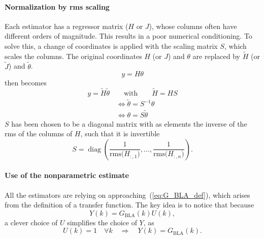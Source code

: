 \paragraph{Normalization by rms scaling} Each estimator has a regressor matrix ($H$ or $J$), whose columns often have different orders of magnitude. This results in a poor numerical conditioning. To solve this, a change of coordinates is applied with the scaling matrix $S$, which scales the columns. The original coordinates $H$ (or $J$) and $\theta$ are replaced by $\tilde{H}$ (or $\tilde{J}$) and $\tilde{\theta}$.
\begin{equation}
    y = H \theta
\end{equation}
then becomes
\begin{equation}
    y = \tilde{H} \tilde{\theta} \qquad \text{with} \qquad \tilde{H} = H S
\end{equation}
\vspace{-0.8cm}
\begin{align}
    &\Leftrightarrow \tilde{\theta} = S^{-1} \theta\\
    &\Leftrightarrow \theta = S \tilde{\theta}
\end{align}
$S$ has been chosen to be a diagonal matrix with as elements the inverse of the rms of the columns of $H$, such that it is invertible
\begin{equation}
S = \operatorname{diag}\!\left( \frac{1}{\mathrm{rms}\bigl(H_{:,1}\bigr)}, \dots, \frac{1}{\mathrm{rms}\bigl(H_{:,n}\bigr)} \right).
\end{equation}

\paragraph{Use of the nonparametric estimate} All the estimators are relying on approaching~(\ref{eq:G_BLA_def}), which arises from the definition of a transfer function. The key idea is to notice that because
\begin{equation}
    Y(k) = G_{\text{BLA}}(k) U(k),
    \label{eq:G_BLA_def}
\end{equation}
a clever choice of $U$ simplifies the choice of $Y$, as
\begin{equation}
    U(k) = 1 \quad \forall k \quad \Rightarrow \quad Y(k) = G_{\text{BLA}}(k).
\end{equation}

